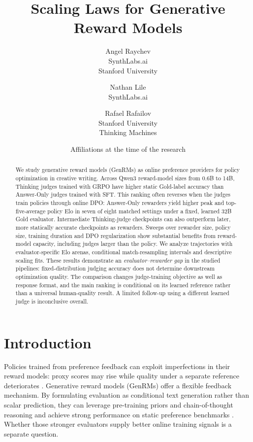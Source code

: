 \documentclass[11pt,letterpaper]{article}
\title{Scaling Laws for Generative Reward Models}
\author{
Angel Raychev\\
SynthLabs.ai\\
Stanford University
\and
Nathan Lile\\
SynthLabs.ai
\and
Rafael Rafailov\\
Stanford University\\
Thinking Machines
}
\date{\small Affiliations at the time of the research}
\begin{document}
\maketitle

\begin{abstract}
We study generative reward models (GenRMs) as online preference providers for policy optimization in creative writing. Across Qwen3 reward-model sizes from 0.6B to 14B, Thinking judges trained with GRPO have higher static Gold-label accuracy than Answer-Only judges trained with SFT. This ranking often reverses when the judges train policies through online DPO: Answer-Only rewarders yield higher peak and top-five-average policy Elo in seven of eight matched settings under a fixed, learned 32B Gold evaluator. Intermediate Thinking-judge checkpoints can also outperform later, more statically accurate checkpoints as rewarders. Sweeps over rewarder size, policy size, training duration and DPO regularization show substantial benefits from reward-model capacity, including judges larger than the policy. We analyze trajectories with evaluator-specific Elo arenas, conditional match-resampling intervals and descriptive scaling fits. These results demonstrate an \emph{evaluator--rewarder gap} in the studied pipelines: fixed-distribution judging accuracy does not determine downstream optimization quality. The comparison changes judge-training objective as well as response format, and the main ranking is conditional on its learned reference rather than a universal human-quality result. A limited follow-up using a different learned judge is inconclusive overall.
\end{abstract}

\section{Introduction}

Policies trained from preference feedback can exploit imperfections in their reward models: proxy scores may rise while quality under a separate reference deteriorates \citep{gao2022scaling,rafailov2024rewardoveropt}. Generative reward models (GenRMs) offer a flexible feedback mechanism. By formulating evaluation as conditional text generation rather than scalar prediction, they can leverage pre-training priors and chain-of-thought reasoning and achieve strong performance on static preference benchmarks \citep{mahan2024generative,zhang2024genverifier,whitehouse2025j1}. Whether those stronger evaluators supply better online training signals is a separate question.
\end{document}
